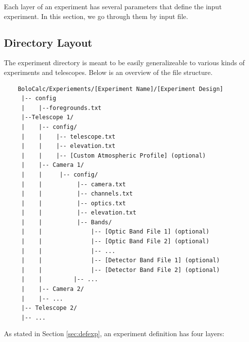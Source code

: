 \documentclass[11pt]{article} %
\begin{document}
Each layer of an experiment has several parameters that define the input experiment. In this section, we go through them by input file.


\subsection{Directory Layout}

The experiment directory is meant to be easily generalizeable to various kinds of experiments and telescopes. Below is an overview of the file structure.

\begin{lstlisting}
	BoloCalc/Experiements/[Experiment Name]/[Experiment Design]
 	 |-- config
	 |    |--foregrounds.txt
	 |--Telescope 1/
	 |    |-- config/
	 |    |    |-- telescope.txt
	 |    |    |-- elevation.txt
	 |    |    |-- [Custom Atmospheric Profile] (optional)
	 |    |-- Camera 1/
	 |    |     |-- config/
	 |    |          |-- camera.txt
	 |    |          |-- channels.txt
	 |    |          |-- optics.txt
	 |    |          |-- elevation.txt
	 |    |          |-- Bands/
	 |    |	             |-- [Optic Band File 1] (optional)
	 |    |	             |-- [Optic Band File 2] (optional)
	 |    |	             |-- ...
	 |    |	             |-- [Detector Band File 1] (optional)
	 |    |	             |-- [Detector Band File 2] (optional)
	 |    |		    |-- ...
	 |    |-- Camera 2/
	 |    |-- ...
	 |-- Telescope 2/
	 |-- ...
\end{lstlisting}

As stated in Section \ref{sec:defexp}, an experiment definition has four layers:
\end{document}
